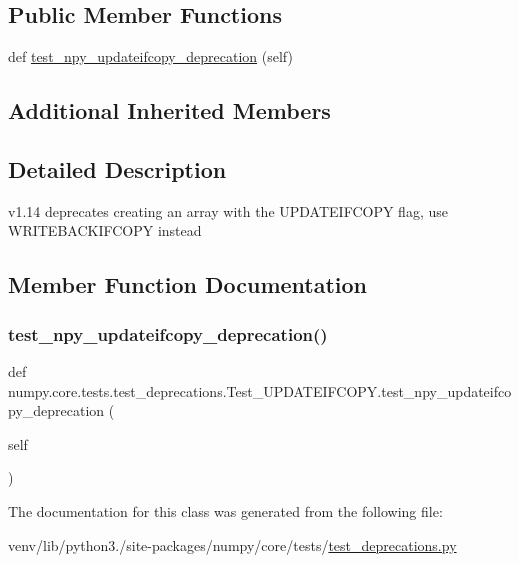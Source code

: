 \subsection*{Public Member Functions}
\begin{DoxyCompactItemize}
\item 
def \hyperlink{classnumpy_1_1core_1_1tests_1_1test__deprecations_1_1Test__UPDATEIFCOPY_ad9215af47d3fd0d0b380031d5820f860}{test\+\_\+npy\+\_\+updateifcopy\+\_\+deprecation} (self)
\end{DoxyCompactItemize}
\subsection*{Additional Inherited Members}


\subsection{Detailed Description}
\begin{DoxyVerb}v1.14 deprecates creating an array with the UPDATEIFCOPY flag, use
WRITEBACKIFCOPY instead
\end{DoxyVerb}
 

\subsection{Member Function Documentation}
\mbox{\label{classnumpy_1_1core_1_1tests_1_1test__deprecations_1_1Test__UPDATEIFCOPY_ad9215af47d3fd0d0b380031d5820f860}} 
\subsubsection{\texorpdfstring{test\+\_\+npy\+\_\+updateifcopy\+\_\+deprecation()}{test\_npy\_updateifcopy\_deprecation()}}
{\footnotesize\ttfamily def numpy.\+core.\+tests.\+test\+\_\+deprecations.\+Test\+\_\+\+U\+P\+D\+A\+T\+E\+I\+F\+C\+O\+P\+Y.\+test\+\_\+npy\+\_\+updateifcopy\+\_\+deprecation (\begin{DoxyParamCaption}\item[{}]{self }\end{DoxyParamCaption})}



The documentation for this class was generated from the following file\+:\begin{DoxyCompactItemize}
\item 
venv/lib/python3./site-\/packages/numpy/core/tests/\hyperlink{core_2tests_2test__deprecations_8py}{test\+\_\+deprecations.\+py}\end{DoxyCompactItemize}
